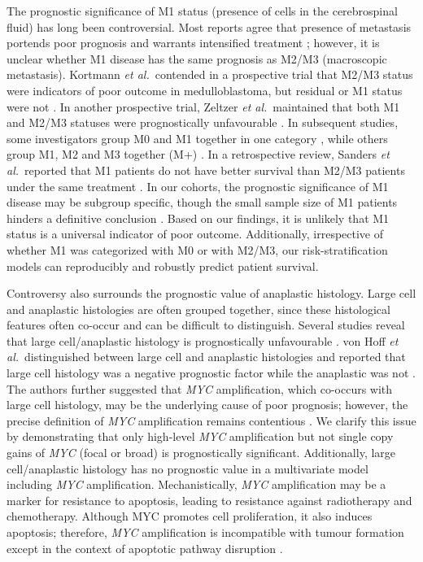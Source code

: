 The prognostic significance of M1 status (presence of cells in the cerebrospinal fluid) has long been controversial. Most reports agree that presence of metastasis portends poor prognosis and warrants intensified treatment ; however, it is unclear whether M1 disease has the same prognosis as M2/M3 (macroscopic metastasis). Kortmann \emph{et al.}\ contended in a prospective trial that M2/M3 status were indicators of poor outcome in medulloblastoma, but residual or M1 status were not . In another prospective trial, Zeltzer \emph{et al.}\ maintained that both M1 and M2/M3 statuses were prognostically unfavourable . In subsequent studies, some investigators group M0 and M1 together in one category , while others group M1, M2 and M3 together (M+) . In a retrospective review, Sanders \emph{et al.}\ reported that M1 patients do not have better survival than M2/M3 patients under the same treatment . In our cohorts, the prognostic significance of M1 disease may be subgroup specific, though the small sample size of M1 patients hinders a definitive conclusion . Based on our findings, it is unlikely that M1 status is a universal indicator of poor outcome. Additionally, irrespective of whether M1 was categorized with M0 or with M2/M3, our risk-stratification models can reproducibly and robustly predict patient survival.

Controversy also surrounds the prognostic value of anaplastic histology. Large cell and anaplastic histologies are often grouped together, since these histological features often co-occur and can be difficult to distinguish. Several studies reveal that large cell/anaplastic histology is prognostically unfavourable . von Hoff \emph{et al.}\ distinguished between large cell and anaplastic histologies and reported that large cell histology was a negative prognostic factor while the anaplastic was not . The authors further suggested that \emph{MYC} amplification, which co-occurs with large cell histology, may be the underlying cause of poor prognosis; however, the precise definition of \emph{MYC} amplification remains contentious . We clarify this issue by demonstrating that only high-level \emph{MYC} amplification but not single copy gains of \emph{MYC} (focal or broad) is prognostically significant. Additionally, large cell/anaplastic histology has no prognostic value in a multivariate model including \emph{MYC} amplification. Mechanistically, \emph{MYC} amplification may be a marker for resistance to apoptosis, leading to resistance against radiotherapy and chemotherapy. Although MYC promotes cell proliferation, it also induces apoptosis; therefore, \emph{MYC} amplification is incompatible with tumour formation except in the context of apoptotic pathway disruption .

